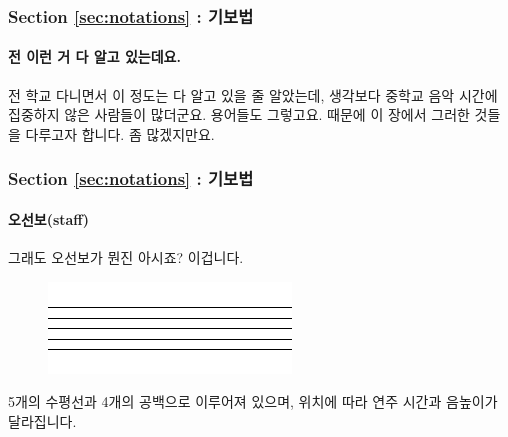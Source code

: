 \documentclass{beamer}
\begin{document}
	\begin{frame}
		\frametitle{Section \ref{sec:notations} : 기보법}
		\framesubtitle{전 이런 거 다 알고 있는데요.}
		전 학교 다니면서 이 정도는 다 알고 있을 줄 알았는데, 생각보다 중학교 음악 시간에 집중하지 않은 사람들이 많더군요. 용어들도 그렇고요. 때문에 이 장에서 그러한 것들을 다루고자 합니다. 좀 많겠지만요.
	\end{frame}
	
	\begin{frame}
		\frametitle{Section \ref{sec:notations} : 기보법}
		\framesubtitle{오선보(staff)}
		그래도 오선보가 뭔진 아시죠? 이겁니다.
		\begin{figure}[h!]
			\centering
			\includegraphics[width=0.5\columnwidth]{res/pdf/4/staff/staff.pdf}
		\end{figure}
		\vskip -1pc
		5개의 수평선과 4개의 공백으로 이루어져 있으며, 위치에 따라 연주 시간과 음높이가 달라집니다.
	\end{frame}
	
\end{document}
